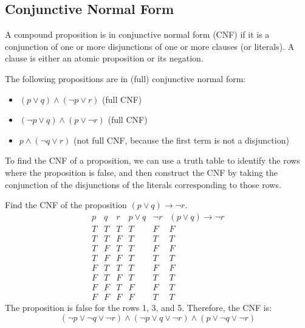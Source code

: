 \subsection{Conjunctive Normal Form}
\begin{definition}
    A compound proposition is in conjunctive normal form (CNF) if it is a conjunction of one or more disjunctions of one or more clauses (or literals). A clause is either an atomic proposition or its negation.
\end{definition}
\begin{eg}
    The following propositions are in (full) conjunctive normal form:
    \begin{itemize}[itemsep=1pt,label=$\circ$]
        \item \((p \lor q) \land (\neg p \lor r)\) (full CNF)
        \item \((\neg p \lor q) \land (p \lor \neg r)\) (full CNF)
        \item \(p \land (\neg q \lor r)\) (not full CNF, because the first term is not a disjunction)
    \end{itemize}
\end{eg}
To find the CNF of a proposition, we can use a truth table to identify the rows where the proposition is false, and then construct the CNF by taking the conjunction of the disjunctions of the literals corresponding to those rows.
\begin{eg}
    Find the CNF of the proposition $(p \lor q) \to \neg r$.
    \[
        \begin{array}{c|c|c|c|c|c}
            p & q & r & p \lor q & \neg r & (p \lor q) \to \neg r \\
            \hline
            T & T & T & T & F & F \\
            T & T & F & T & T & T \\
            T & F & T & T & F & F \\
            T & F & F & T & T & T \\
            F & T & T & T & F & F \\
            F & T & F & T & T & T \\
            F & F & T & F & F & T \\
            F & F & F & F & T & T
        \end{array}
    \]
    The proposition is false for the rows 1, 3, and 5. Therefore, the CNF is:
    \[ ( \neg p \lor \neg q \lor \neg r) \land ( \neg p \lor q \lor \neg r) \land (p \lor \neg q \lor \neg r) \]
\end{eg}

